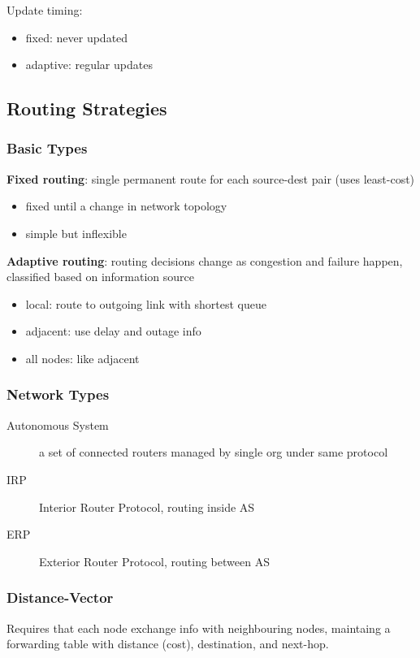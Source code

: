 \documentclass[]{article}
\theoremstyle{definition}
\begin{document}
	Update timing:
	\begin{itemize}
		\item fixed: never updated
		\item adaptive: regular updates
	\end{itemize}

	\subsection{Routing Strategies}
	\subsubsection{Basic Types}
	\textbf{Fixed routing}: single permanent route for each source-dest pair (uses least-cost)
	\begin{itemize}
		\item fixed until a change in network topology
		\item simple but inflexible
	\end{itemize}
	\textbf{Adaptive routing}: routing decisions change as congestion and failure happen, classified based on information source
	\begin{itemize}
		\item local: route to outgoing link with shortest queue
		\item adjacent: use delay and outage info
		\item all nodes: like adjacent
	\end{itemize}

	\subsubsection{Network Types}
	\begin{description}
		\item[Autonomous System] a set of connected routers managed by single org under same protocol 
		\item[IRP] Interior Router Protocol, routing inside AS
		\item[ERP] Exterior Router Protocol, routing between AS
	\end{description}

	\subsubsection{Distance-Vector}
	Requires that each node exchange info with neighbouring nodes, maintaing a forwarding table with distance (cost), destination, and next-hop.
\end{document}
